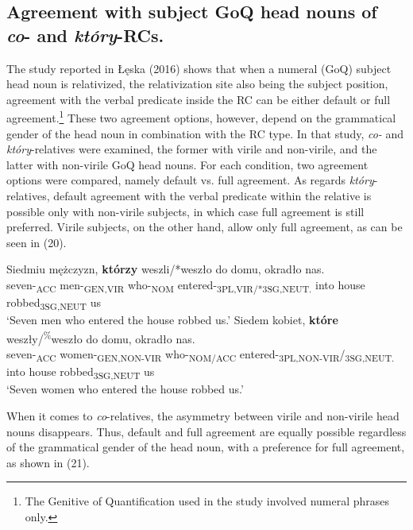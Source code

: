 \documentclass[output=paper]{langsci/langscibook}
\begin{document}
\subsection{Agreement with subject GoQ head nouns of \textit{co}{}- and \textit{który}{}-RCs.}%
The study reported in Łęska (2016) shows that when a numeral (GoQ) subject head noun is relativized, the relativization site also being the subject position, agreement with the verbal predicate inside the RC can be either default or full agreement.\footnote{The Genitive of Quantification used in the study involved numeral phrases only.} These two agreement options, however, depend on the grammatical gender of the head noun in combination with the RC type. In that study, \textit{co-} and \textit{który}{}-relatives were examined, the former with virile and non-virile, and the latter with non-virile GoQ head nouns. For each condition, two agreement options were compared, namely default vs. full agreement. As regards \textit{który}{}-relatives, default agreement with the verbal predicate within the relative is possible only with non-virile subjects, in which case full agreement is still preferred. Virile subjects, on the other hand, allow only full agreement, as can be seen in (20).

\ea%
    \label{ex:leska:20}
    \ea
    \gll Siedmiu   mężczyzn,  \textbf{którzy}   weszli/*weszło  do   domu,   okradło     nas.        \\
          seven-\textsubscript{ACC}   men-\textsubscript{GEN,VIR}   who-\textsubscript{NOM}  entered-\textsubscript{3PL,VIR/*3SG,NEUT.}       into  house     robbed\textsubscript{3SG,NEUT}   us   \\
    \glt ‘Seven men who entered the house robbed us.’
    \ex
    \gll  Siedem   kobiet,     \textbf{które}   weszły/\textsuperscript{\%}weszło       do   domu,   okradło     nas.  \\
           seven-\textsubscript{ACC}   women-\textsubscript{GEN,NON-VIR} who-\textsubscript{NOM/ACC}  entered-\textsubscript{3PL,NON-VIR}/\textsubscript{3SG,NEUT.}  into   house     robbed\textsubscript{3SG,NEUT}   us\\
    \glt  ‘Seven women who entered the house robbed us.’
    \z
\z    

When it comes to \textit{co}{}-relatives, the asymmetry between virile and non-virile head nouns disappears. Thus, default and full agreement are equally possible regardless of the grammatical gender of the head noun, with a preference for full agreement, as shown in (21).
 
\end{document}

